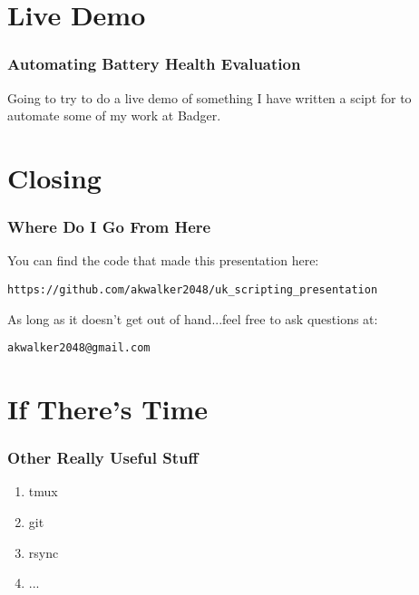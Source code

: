 \documentclass{beamer}
\begin{document}
\section{Live Demo}
\begin{frame}\frametitle{Automating Battery Health Evaluation}
  Going to try to do a live demo of something I have written a scipt for to automate some of my work at Badger.
\end{frame}

\section{Closing}
\begin{frame}[fragile]\frametitle{Where Do I Go From Here}
  You can find the code that made this presentation here:
\begin{verbatim}
https://github.com/akwalker2048/uk_scripting_presentation
\end{verbatim}

As long as it doesn't get out of hand...feel free to ask questions at:
\begin{verbatim}
akwalker2048@gmail.com
\end{verbatim}
\end{frame}

\section{If There's Time}
\begin{frame}\frametitle{Other Really Useful Stuff}
  \begin{enumerate}
  \item tmux
  \item git
  \item rsync
  \item ...
  \end{enumerate}
\end{frame}
\end{document}
